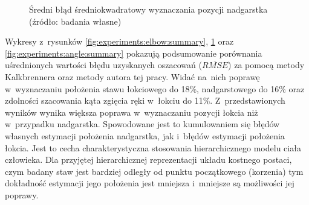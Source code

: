 \begin{savenotes}
	\begin{figure}[!htb]
		\centering
		\caption{Średni błąd średniokwadratowy wyznaczania pozycji nadgarstka (źródło: badania własne)}
		\label{fig:experiments:wrist:summary}
	\end{figure}
\end{savenotes}

Wykresy z~rysunków \ref{fig:experiments:elbow:summary}, \ref{fig:experiments:wrist:summary} oraz \ref{fig:experiments:angle:summary} pokazują podsumowanie porównania uśrednionych wartości błędu uzyskanych oszacowań ($\overline{RMSE}$) za pomocą metody Kalkbrennera oraz metody autora tej pracy.
Widać na~nich poprawę w~wyznaczaniu położenia stawu łokciowego do 18\%, nadgarstowego do 16\% oraz zdolności szacowania kąta zgięcia ręki w~łokciu do 11\%. Z~przedstawionych wyników wynika większa poprawa w~wyznaczaniu pozycji łokcia niż w~przypadku nadgarstka. Spowodowane jest to kumulowaniem się błędów własnych estymacji położenia nadgarstka, jak i~błędów estymacji położenia łokcia. Jest to cecha charakterystyczna stosowania hierarchicznego modelu ciała człowieka. Dla przyjętej hierarchicznej reprezentacji układu kostnego postaci, czym badany staw jest bardziej odległy od punktu początkowego (korzenia) tym dokładność estymacji jego położenia jest mniejsza i~mniejsze są możliwości jej poprawy.\\

